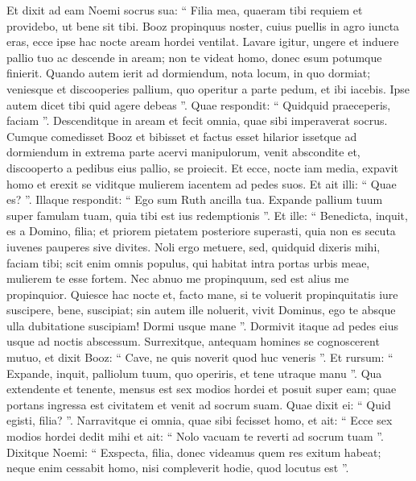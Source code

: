 \begin{biblechapter}
\begin{biblechapter}
\begin{biblechapter}
\verse Et dixit ad eam Noemi socrus sua: “ Filia mea, quaeram tibi requiem et providebo, ut bene sit tibi. 
\verse Booz propinquus noster, cuius puellis in agro iuncta eras, ecce ipse hac nocte aream hordei ventilat. 
\verse Lavare igitur, ungere et induere pallio tuo ac descende in aream; non te videat homo, donec esum potumque finierit. 
\verse Quando autem ierit ad dormiendum, nota locum, in quo dormiat; veniesque et discooperies pallium, quo operitur a parte pedum, et ibi iacebis. Ipse autem dicet tibi quid agere debeas ”. 
\verse Quae respondit: “ Quidquid praeceperis, faciam ”.
 \verse Descenditque in aream et fecit omnia, quae sibi imperaverat socrus.
 \verse Cumque comedisset Booz et bibisset et factus esset hilarior issetque ad dormiendum in extrema parte acervi manipulorum, venit abscondite et, discooperto a pedibus eius pallio, se proiecit. 
\verse Et ecce, nocte iam media, expavit homo et erexit se viditque mulierem iacentem ad pedes suos. 
\verse Et ait illi: “ Quae es? ”. Illaque respondit: “ Ego sum Ruth ancilla tua. Expande pallium tuum super famulam tuam, quia tibi est ius redemptionis ”. 
\verse Et ille: “ Benedicta, inquit, es a Domino, filia; et priorem pietatem posteriore superasti, quia non es secuta iuvenes pauperes sive divites. 
\verse Noli ergo metuere, sed, quidquid dixeris mihi, faciam tibi; scit enim omnis populus, qui habitat intra portas urbis meae, mulierem te esse fortem. 
\verse Nec abnuo me propinquum, sed est alius me propinquior. 
\verse Quiesce hac nocte et, facto mane, si te voluerit propinquitatis iure suscipere, bene, suscipiat; sin autem ille noluerit, vivit Dominus, ego te absque ulla dubitatione suscipiam! Dormi usque mane ”.
 \verse Dormivit itaque ad pedes eius usque ad noctis abscessum. Surrexitque, antequam homines se cognoscerent mutuo, et dixit Booz: “ Cave, ne quis noverit quod huc veneris ”. 
\verse Et rursum: “ Expande, inquit, palliolum tuum, quo operiris, et tene utraque manu ”. Qua extendente et tenente, mensus est sex modios hordei et posuit super eam; quae portans ingressa est civitatem 
\verse et venit ad socrum suam. Quae dixit ei: “ Quid egisti, filia? ”. Narravitque ei omnia, quae sibi fecisset homo, 
\verse et ait: “ Ecce sex modios hordei dedit mihi et ait: “ Nolo vacuam te reverti ad socrum tuam ”. 
\verse Dixitque Noemi: “ Exspecta, filia, donec videamus quem res exitum habeat; neque enim cessabit homo, nisi compleverit hodie, quod locutus est ”.
 

\end{biblechapter}
\end{biblechapter}
\end{biblechapter}

